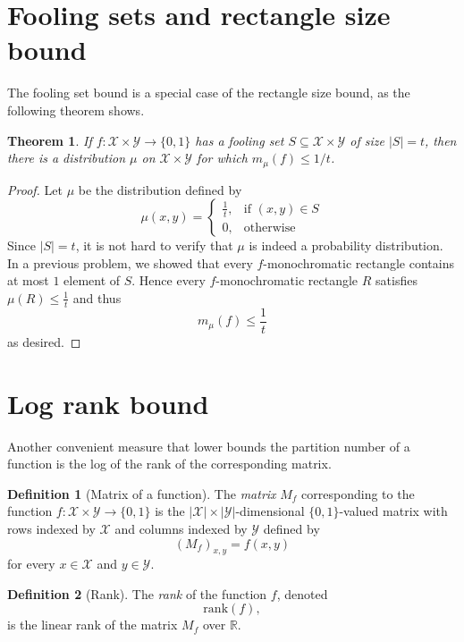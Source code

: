 \documentclass[11pt]{amsart}
\theoremstyle{plain}
\newtheorem{theorem}{Theorem}
\theoremstyle{definition}
\newtheorem{definition}{Definition}
\theoremstyle{plain}
\newcommand{\calX}{\mathcal{X}}
\newcommand{\calY}{\mathcal{Y}}
\newcommand{\R}{\mathbb{R}}
\newcommand{\rank}{\mathrm{rank}}
\begin{document}
\newpage \section{Fooling sets and rectangle size bound}

The fooling set bound is a special case of the rectangle size bound, as the following theorem shows.

\begin{theorem}
If $f : \calX \times \calY \to \{0,1\}$ has a fooling set $S \subseteq \calX \times \calY$ of size $|S| = t$, then there is a distribution $\mu$ on $\calX \times \calY$ for which $m_\mu(f) \le 1/t$.
\end{theorem}

\begin{proof}
Let $\mu$ be the distribution defined by 
$$\mu(x,y) = \begin{cases}
\frac{1}{t}, &\text{if } (x,y) \in S \\
0, &\text{otherwise}
\end{cases}$$
Since $|S| = t$, it is not hard to verify that $\mu$ is indeed a probability distribution. In a previous problem, we showed that every $f$-monochromatic rectangle contains at most $1$ element of $S$. Hence every $f$-monochromatic rectangle $R$ satisfies $\mu(R) \leq \frac{1}{t}$ and thus
$$m_\mu(f) \leq\frac{1}{t}$$
as desired.
\end{proof}


\newpage \section{Log rank bound}

Another convenient measure that lower bounds the partition number of a function is the log of the rank of the corresponding matrix.

\begin{definition}[Matrix of a function]
The \emph{matrix} $M_f$ corresponding to the function $f : \calX \times \calY \to \{0,1\}$ is the $|\calX| \times |\calY|$-dimensional $\{0,1\}$-valued matrix with rows indexed by $\calX$ and columns indexed by $\calY$ defined by
\[
(M_f)_{x,y} = f(x,y)
\]
for every $x \in \calX$ and $y \in \calY$.
\end{definition}

\begin{definition}[Rank]
The \emph{rank} of the function $f$, denoted
\[
\rank(f),
\] 
is the linear rank of the matrix $M_f$ over $\R$.
\end{definition}
\end{document}
